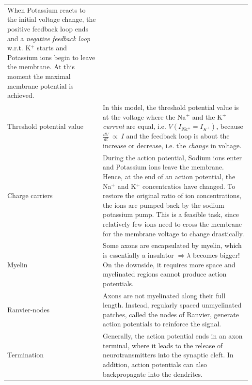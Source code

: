 \begin{longtable}{p{4cm}p{15cm}}
		  When Potassium reacts to the initial voltage change, the positive feedback loop ends and a \textit{negative feedback loop} w.r.t. K$^+$ starts and Potassium ions begin to leave the membrane. At this moment the maximal membrane potential is achieved.\\
Threshold potential value	& In this model, the threshold potential value is at the voltage where the Na$^+$ and the K$^+$ \textit{current} are equal, i.e. $V(I_{Na^+} = I_{K^+})$, because $\frac{dV}{dt}~ \propto ~ I$ and the feedback loop is about the increase or decrease, i.e. the \textit{change} in voltage.\\
Charge carriers	      & During the action potential, Sodium ions enter and Potassium ions leave the membrane. Hence, at the end of an action potential, the Na$^+$ and K$^+$ concentratios have changed. To restore the original ratio of ion concentrations, the ions are pumped back by the sodium potassium pump. This is a feasible task, since relatively few ions need to cross the membrane for the membrane voltage to change drastically.\\
Myelin	& Some axons are encapsulated by myelin, which is essentially a insulator $\Rightarrow \lambda$ becomes bigger! On the downside, it requires more space and myelinated regions cannot produce action potentials.\\
Ranvier-nodes	& Axons are not myelinated along their full length. Instead, regularly spaced unmyelinated patches, called the nodes of Ranvier, generate action potentials to reinforce the signal.\\
Termination	& Generally, the action potential ends in an axon terminal, where it leads to the release of neurotransmitters into the synaptic cleft. In addition, action potentials can also backpropagate into the dendrites.
\end{longtable}
